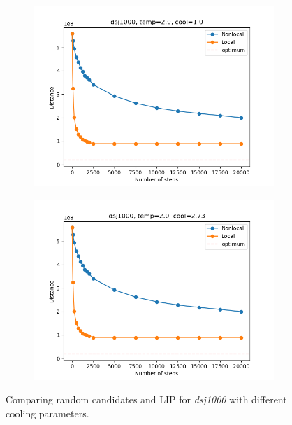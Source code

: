 \begin{figure}[!htb]
	\centering
	\begin{subfigure}{0.45\textwidth}
		\includegraphics[width=\textwidth]{img/dsj1000_temp=2.0_cool=1.0}
	\end{subfigure}
	\begin{subfigure}{0.45\textwidth}
		\includegraphics[width=\textwidth]{img/dsj1000_temp=2.0_cool=2.73}
	\end{subfigure}
	\caption{Comparing random candidates and LIP for \textit{dsj1000} with different cooling parameters.}
	\label{fig:dsj1000_comp}
\end{figure}